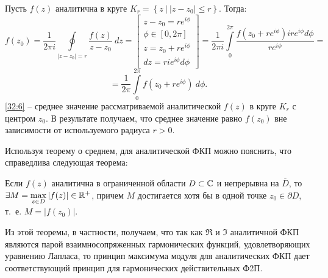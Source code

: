 \documentclass[../../main.tex]{subfiles}
\begin{document}
\begin{corollary*}	
	Пусть $f(z)$ аналитична в круге $K_r = \left\lbrace z \  \big| \ |z-z_0| \le 
	r   \right\rbrace $. Тогда:
	\[   f(z_0) = \frac{1}{2 \pi i} \oint \limits_{|z-z_0| = r} 
	\frac{f(z)}{z-z_0} \ dz = \left[\begin{gathered} z-z_0 = r e^{i\phi} \\
	\phi \in [0,2\pi]  \\
	z = z_0 + r e^{i\phi} \\
	dz = r i e^{i\phi} d \phi
	\end{gathered} \right] = \frac{1}{2 \pi i} \int \limits_{0}^{2\pi} 
	\frac{f(z_0 +r e^{i\phi} ) i r e^{i\phi} d\phi}{r e^{i\phi}}  =     \]
	\begin{equation}
	\label{32:6}
	= \frac{1}{2 \pi } \int \limits_{0}^{2\pi} f(z_0 +r e^{i\phi} ) \ d \phi.
	\end{equation}
	\eqref{32:6} \--- среднее значение рассматриваемой аналитической $f(z)$  
	в круге $K_r$ с 
	центром $z_0$. В результате получаем, что среднее значение 
	равно $f(z_0)$ вне зависимости от используемого радиуса $r>0$.
\end{corollary*}
\begin{remark}
	Используя теорему о среднем, для аналитической ФКП можно пояснить, что 
	справедлива следующая теорема:
\end{remark}
\begin{theorem}
	Если $f(z)$ аналитична в ограниченной области $D \subset \mathbb{C}$ и непрерывна на 
	$\overline{D}$, то $\exists M = \max \limits_{z\in D} |f(z)| \in \mathbb{R}^+$, причем 
	$M$ достигается хотя бы в одной точке $z_0 \in \partial D$, т.~е. $M = 
	|f(z_0)|$.
\end{theorem}		
Из этой теоремы, в частности, получаем, что так как $\Re$ и $\Im$ аналитичной 
ФКП 
являются парой взаимносопряженных гармонических функций, удовлетворяющих 
уравнению Лапласа, то принцип максимума модуля для аналитических ФКП дает 
соответствующий принцип для гармонических действительных Ф2П.
	
\end{document}
